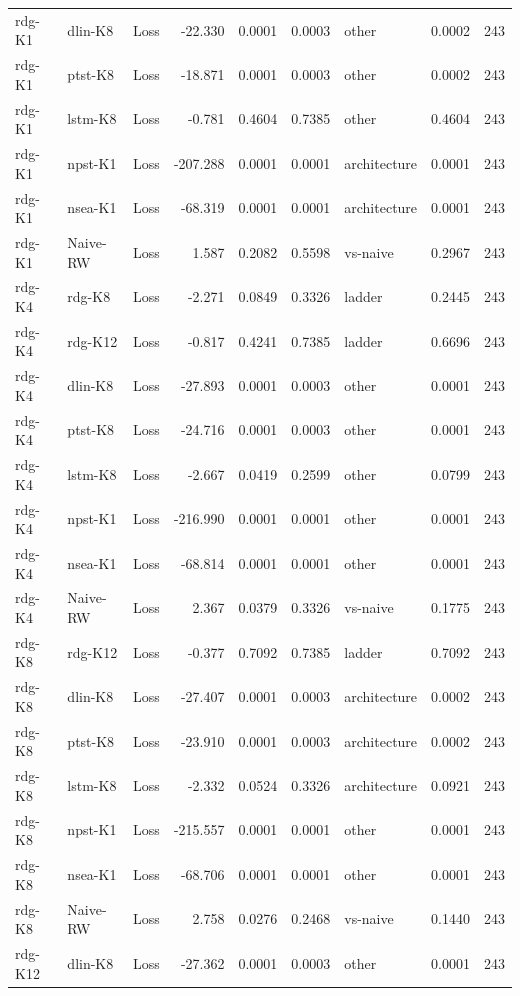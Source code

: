 \begin{table}[!t]
\begin{tabular}{llcrrrlrr}
rdg-K1 & dlin-K8 & Loss & -22.330 & 0.0001 & 0.0003 & other & 0.0002 & 243 \\
rdg-K1 & ptst-K8 & Loss & -18.871 & 0.0001 & 0.0003 & other & 0.0002 & 243 \\
rdg-K1 & lstm-K8 & Loss & -0.781 & 0.4604 & 0.7385 & other & 0.4604 & 243 \\
rdg-K1 & npst-K1 & Loss & -207.288 & 0.0001 & 0.0001 & architecture & 0.0001 & 243 \\
rdg-K1 & nsea-K1 & Loss & -68.319 & 0.0001 & 0.0001 & architecture & 0.0001 & 243 \\
rdg-K1 & Naive-RW & Loss & 1.587 & 0.2082 & 0.5598 & vs-naive & 0.2967 & 243 \\
rdg-K4 & rdg-K8 & Loss & -2.271 & 0.0849 & 0.3326 & ladder & 0.2445 & 243 \\
rdg-K4 & rdg-K12 & Loss & -0.817 & 0.4241 & 0.7385 & ladder & 0.6696 & 243 \\
rdg-K4 & dlin-K8 & Loss & -27.893 & 0.0001 & 0.0003 & other & 0.0001 & 243 \\
rdg-K4 & ptst-K8 & Loss & -24.716 & 0.0001 & 0.0003 & other & 0.0001 & 243 \\
rdg-K4 & lstm-K8 & Loss & -2.667 & 0.0419 & 0.2599 & other & 0.0799 & 243 \\
rdg-K4 & npst-K1 & Loss & -216.990 & 0.0001 & 0.0001 & other & 0.0001 & 243 \\
rdg-K4 & nsea-K1 & Loss & -68.814 & 0.0001 & 0.0001 & other & 0.0001 & 243 \\
rdg-K4 & Naive-RW & Loss & 2.367 & 0.0379 & 0.3326 & vs-naive & 0.1775 & 243 \\
rdg-K8 & rdg-K12 & Loss & -0.377 & 0.7092 & 0.7385 & ladder & 0.7092 & 243 \\
rdg-K8 & dlin-K8 & Loss & -27.407 & 0.0001 & 0.0003 & architecture & 0.0002 & 243 \\
rdg-K8 & ptst-K8 & Loss & -23.910 & 0.0001 & 0.0003 & architecture & 0.0002 & 243 \\
rdg-K8 & lstm-K8 & Loss & -2.332 & 0.0524 & 0.3326 & architecture & 0.0921 & 243 \\
rdg-K8 & npst-K1 & Loss & -215.557 & 0.0001 & 0.0001 & other & 0.0001 & 243 \\
rdg-K8 & nsea-K1 & Loss & -68.706 & 0.0001 & 0.0001 & other & 0.0001 & 243 \\
rdg-K8 & Naive-RW & Loss & 2.758 & 0.0276 & 0.2468 & vs-naive & 0.1440 & 243 \\
rdg-K12 & dlin-K8 & Loss & -27.362 & 0.0001 & 0.0003 & other & 0.0001 & 243 \\

\end{tabular}
\end{table}
